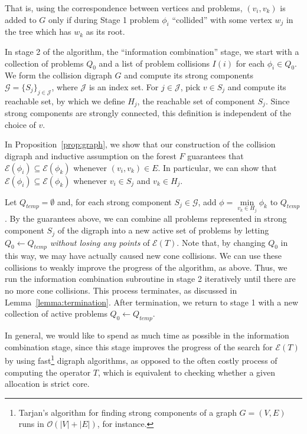\documentclass[11pt,reqno]{amsart}
\theoremstyle{definition}
\numberwithin{equation}{section}
\newcommand{\pre}{\phi}
\newcommand{\sub}{\subseteq}
\newcommand{\fix}{\mathcal{E}}
\newcommand{\strongc}{\mathcal{G}}
\newcommand{\strongcomp}{S}
\newcommand{\acto}{Q_0}
\newcommand{\actt}{Q_{temp}}
\newcommand{\coll}{I}
\newcommand{\reach}{H}
\newcommand{\forest}{F}
\begin{document}
That is, using the correspondence between vertices and problems, $(v_i,v_k)$ is added to $G$ only if during Stage 1 problem $\pre_i$ ``collided'' with some vertex $w_j$ in the tree which has $w_k$ as its root.  

In stage 2 of the algorithm, the ``information combination'' stage, we start with a collection of problems $\acto$ and a list of problem collisions $\coll(i)$ for each $\pre_i \in \acto$.
We form the collision digraph $G$ and compute its strong components $\strongc = \{\strongcomp_j\}_{j\in \mathcal{J}}$, where $\mathcal{J}$ is an index set. 
For $j \in \mathcal{J}$, pick $v \in \strongcomp_j$ and compute its reachable set, by which we define $\reach_j$, the reachable set of component $\strongcomp_j$. 
Since strong components are strongly connected, this definition is independent of the choice of $v$. 

In Proposition~\ref{prop:graph}, we show that our construction of the collision digraph and inductive assumption on the forest $\forest$ guarantees that $\fix(\pre_i) \sub \fix(\pre_k)$ whenever $(v_i,v_k) \in E$.
In particular, we can show that $\fix(\pre_i) \sub \fix(\pre_k)$ whenever $v_i \in \strongcomp_j$ and $v_k \in \reach_j$.

Let $\actt = \emptyset$ and, for each strong component $\strongcomp_j \in \strongc$, add $\pre = \min\limits_{v_k \in \reach_j} \pre_k$ to $\actt$.
By the guarantees above, we can combine all problems represented in strong component $\strongcomp_j$ of the digraph into a new active set of problems by letting $\acto \leftarrow \actt$ \emph{without losing any points} of $\fix(T)$.
Note that, by changing $\acto$ in this way, we may have actually caused new cone collisions.
We can use these collisions to weakly improve the progress of the algorithm, as above.
Thus, we run the information combination subroutine in stage 2 iteratively until there are no more cone collisions.
This process terminates, as discussed in Lemma~\ref{lemma:termination}.
After termination, we return to stage 1 with a new collection of active problems $\acto \leftarrow \actt$.

In general, we would like to spend as much time as possible in the information combination stage, since this stage improves the progress of the search for $\fix(T)$ by using fast\footnote{Tarjan's algorithm for finding strong components of a graph $G = (V,E)$ runs in $\mathcal{O}(|V| + |E|)$, for instance.} digraph algorithms, as opposed to the often costly process of computing the operator $T$, which is equivalent to checking whether a given allocation is strict core.  
\end{document}

